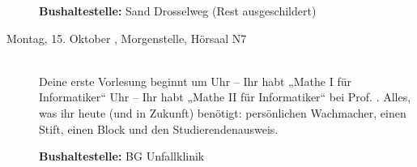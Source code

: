 \begin{description}
\textbf{Bushaltestelle:} Sand Drosselweg (Rest ausgeschildert)

\ifbachelor
\item[Montag, 15. Oktober \Jahr, Morgenstelle, Hörsaal N7]\ \\
Deine erste Vorlesung beginnt um 
 Uhr -- Ihr habt „Mathe I für Informatiker“  \fi
{} Uhr -- Ihr habt „Mathe II für Informatiker“  \fi
bei Prof. \Matheprof.
Alles, was ihr heute (und in Zukunft) benötigt: persönlichen Wachmacher, einen Stift, einen Block und den Studierendenausweis.

\textbf{Bushaltestelle:} BG Unfallklinik
\fi






% 
%




\end{description}
